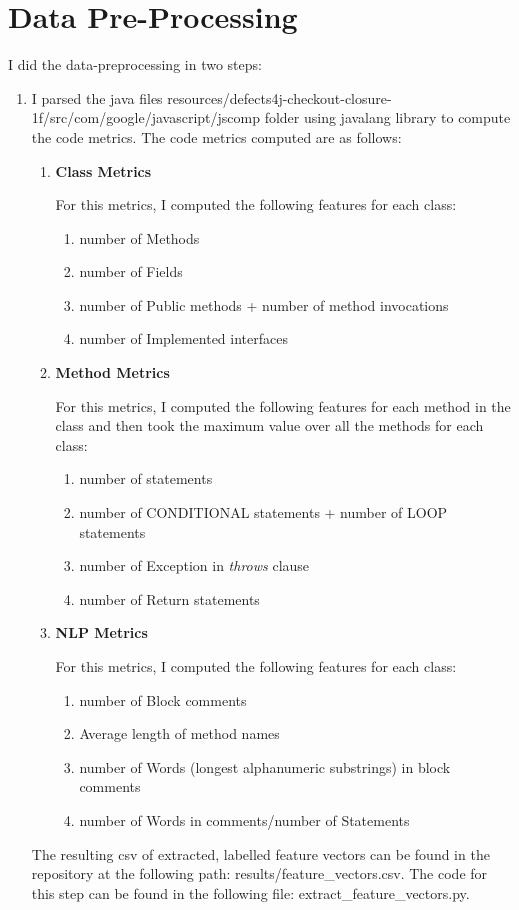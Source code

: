 \documentclass{article}
\begin{document}
\section{Data Pre-Processing}
I did the data-preprocessing in two steps:
\begin{enumerate}
    \item I parsed the java files resources/defects4j-checkout-closure-1f/src/com/google/javascript/jscomp folder using javalang library to compute the code metrics. 
    The code metrics computed are as follows:
    \begin{enumerate}
        \item \textbf{Class Metrics}
    
        For this metrics, I computed the following features for each class:
        \begin{enumerate}
            \item number of Methods
            \item number of Fields
            \item number of Public methods + number of method invocations
            \item number of Implemented interfaces
        \end{enumerate}
        \item \textbf{Method Metrics}
    
        For this metrics, I computed the following features for each method in the class 
        and then took the maximum value over all the methods for each class:
        \begin{enumerate}
            \item number of statements
            \item number of CONDITIONAL statements + number of LOOP statements
            \item number of Exception in \textit{throws} clause
            \item number of Return statements
        \end{enumerate}
        \item  \textbf{NLP Metrics}
        
        For this metrics, I computed the following features for each class:
        \begin{enumerate}
            \item number of Block comments
            \item Average length of method names
            \item number of Words (longest alphanumeric substrings)
            in block comments
            \item number of Words in comments/number of Statements
        \end{enumerate}
    \end{enumerate}
    The resulting csv of extracted, labelled feature vectors can be found in the repository at the following path: results\//feature\_vectors.csv. 
    The code for this step can be found in the following file: extract\_feature\_vectors.py.


\end{enumerate}
\end{document}
